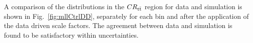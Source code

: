 A comparison of the \mll distributions in the $CR_{\mathrm{t}\bar{\mathrm{t}}}$ region for data and simulation is shown in Fig.~\ref{fig:mllCtrlDD}, separately for each \pth bin and after the application of the data driven scale factors. The agreement between data and simulation is found to be satisfactory within uncertainties.

\begin{figure}[htb]
\centering
{}
\\

\end{figure}
